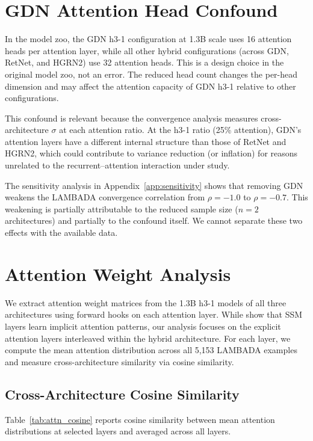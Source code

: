 \section{GDN Attention Head Confound}\label{app:gdn_confound}

In the \citet{wang2025hybrid} model zoo, the GDN h3-1 configuration at 1.3B scale uses 16 attention heads per attention layer, while all other hybrid configurations (across GDN, RetNet, and HGRN2) use 32 attention heads. This is a design choice in the original model zoo, not an error. The reduced head count changes the per-head dimension and may affect the attention capacity of GDN h3-1 relative to other configurations.

This confound is relevant because the convergence analysis measures cross-architecture $\sigma$ at each attention ratio. At the h3-1 ratio (25\% attention), GDN's attention layers have a different internal structure than those of RetNet and HGRN2, which could contribute to variance reduction (or inflation) for reasons unrelated to the recurrent--attention interaction under study.

The sensitivity analysis in Appendix~\ref{app:sensitivity} shows that removing GDN weakens the LAMBADA convergence correlation from $\rho = -1.0$ to $\rho = -0.7$. This weakening is partially attributable to the reduced sample size ($n = 2$ architectures) and partially to the confound itself. We cannot separate these two effects with the available data.

\section{Attention Weight Analysis}\label{app:attention_patterns}

We extract attention weight matrices from the 1.3B h3-1 models of all three architectures using forward hooks on each attention layer. While \citet{ali2025hidden} show that SSM layers learn implicit attention patterns, our analysis focuses on the explicit attention layers interleaved within the hybrid architecture. For each layer, we compute the mean attention distribution across all 5{,}153 LAMBADA examples and measure cross-architecture similarity via cosine similarity.

\subsection{Cross-Architecture Cosine Similarity}

Table~\ref{tab:attn_cosine} reports cosine similarity between mean attention distributions at selected layers and averaged across all layers.

